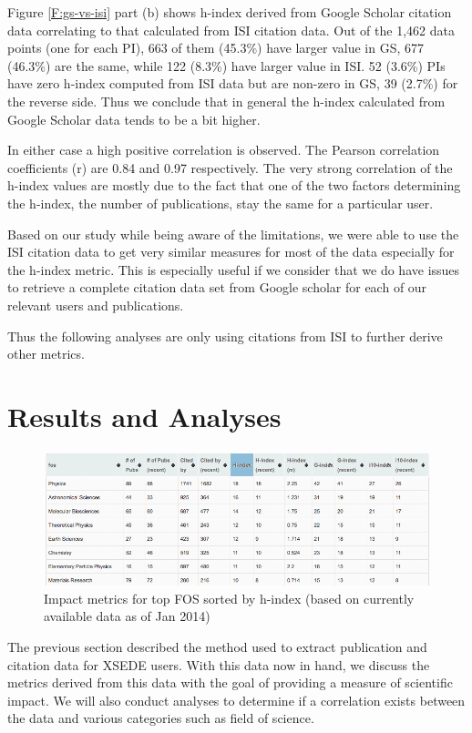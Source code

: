 \documentclass{sig-alternate}
\begin{document}
Figure \ref{F:gs-vs-isi} part (b) shows h-index derived from Google Scholar citation data correlating to that calculated from ISI citation data. Out of the 1,462 data points (one for each PI), 663 of them (45.3\%) have larger value in GS, 677 (46.3\%) are the same, while 122 (8.3\%) have larger value in ISI. 52 (3.6\%) PIs have zero h-index computed from ISI data but are non-zero in GS, 39 (2.7\%) for the reverse side. Thus we conclude that in general the h-index calculated from Google Scholar data tends to be a bit higher. 
 
In either case a high positive correlation is observed. The Pearson correlation coefficients (r) are 0.84 and 0.97 respectively. The very strong correlation of the h-index values are mostly due to the fact that one of the two factors determining the h-index, the number of publications, stay the same for a particular user. 
 
Based on our study while being aware of the limitations, we were able to use the ISI citation data to get very similar measures for most of the data especially for the h-index metric. This is especially useful if we consider that we do have issues to retrieve a complete citation data set from Google scholar for each of our relevant users and publications.

Thus the following analyses are only using citations from ISI to further derive other metrics. 
 
\section{Results and Analyses} \label{S:result}

\begin{figure}[!htb] 
  \centering 
    \includegraphics[width=1.5\columnwidth]{images/XDPUBS_Metrics_FOS.png} 
  \caption{Impact metrics for top FOS sorted by h-index (based on currently available data as of Jan 2014)}\label{F:xdpubs-metrics-fos} 
\end{figure} 
 
The previous section described the method used to extract publication and citation data for XSEDE users.  With this data now in hand, we discuss the metrics derived from this data with the goal of providing a measure of scientific impact. We will also conduct analyses to determine if a correlation exists between the data and various categories such as field of science. 
 
\end{document}
